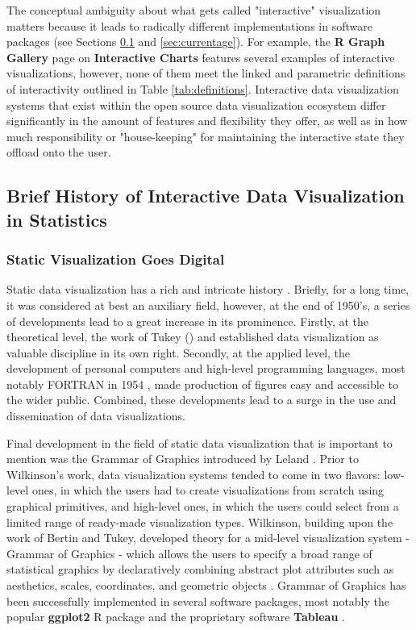 \documentclass[12pt,a4paper]{article}
\begin{document}
The conceptual ambiguity about what gets called "interactive" visualization matters because it leads to radically different implementations in software packages (see Sections \ref{sec:briefhistory} and \ref{sec:currentage}). For example, the \textbf{R Graph Gallery} page on \textbf{Interactive Charts} \citep{holtz2022} features several examples of interactive visualizations, however, none of them meet the linked and parametric definitions of interactivity outlined in Table \ref{tab:definitions}. Interactive data visualization systems that exist within the open source data visualization ecosystem differ significantly in the amount of features and flexibility they offer, as well as in how much responsibility or "house-keeping" for maintaining the interactive state they offload onto the user.     


\subsection{Brief History of Interactive Data Visualization in Statistics}
\label{sec:briefhistory}

\subsubsection{Static Visualization Goes Digital}

Static data visualization has a rich and intricate history \citep[see e.g.][]{dix1998,chen2008, friendly2021,young2011}. Briefly, for a long time, it was considered at best an auxiliary field, however, at the end of 1950's, a series of developments lead to a great increase in its prominence. Firstly, at the theoretical level, the work of Tukey (\citeyear{tukey1962,tukey1977}) and \cite{bertin1967} established data visualization as valuable discipline in its own right. Secondly, at the applied level, the development of personal computers \citep[see e.g.][]{abbate1999} and high-level programming languages, most notably FORTRAN in 1954 \citep{backus1978}, made production of figures easy and accessible to the wider public. Combined, these developments lead to a surge in the use and dissemination of data visualizations.

Final development in the field of static data visualization that is important to mention was the Grammar of Graphics introduced by Leland \cite{wilkinson2012}. Prior to Wilkinson's work, data visualization systems tended to come in two flavors: low-level ones, in which the users had to create visualizations from scratch using graphical primitives, and high-level ones, in which the users could select from a limited range of ready-made visualization types. Wilkinson, building upon the work of Bertin and Tukey, developed theory for a mid-level visualization system - Grammar of Graphics - which allows the users to specify a broad range of statistical graphics by declaratively combining abstract plot attributes such as aesthetics, scales, coordinates, and geometric objects \citep{wilkinson2012}. Grammar of Graphics has been successfully implemented in several software packages, most notably the popular \textbf{ggplot2} R package \citep{wickham2010} and the proprietary software \textbf{Tableau} \citep{tableau2023}. 
\end{document}
